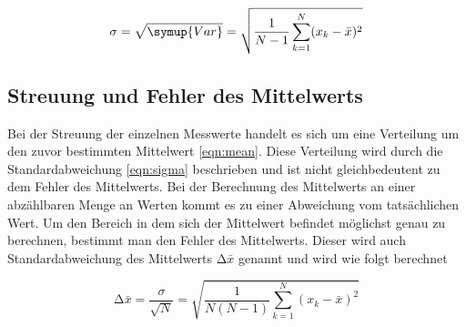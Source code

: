 \begin{equation}
\sigma = \sqrt{\symup{Var}} = \sqrt{\frac{1}{N-1} \sum_{k=1}^N (x_k - \bar{x})^2}
\label{eqn:sigma}
\end{equation}
\subsection{Streuung und Fehler des Mittelwerts}
\begin{flushleft}
Bei der Streuung der einzelnen Messwerte handelt es sich um eine Verteilung um den zuvor bestimmten Mittelwert \eqref{eqn:mean}. 
Diese Verteilung wird durch die Standardabweichung \eqref{eqn:sigma} beschrieben und ist nicht gleichbedeutent zu dem Fehler des Mittelwerts.
Bei der Berechnung des Mittelwerts an einer abzählbaren Menge an Werten kommt es zu einer Abweichung vom tatsächlichen Wert.
Um den Bereich in dem sich der Mittelwert befindet möglichst genau zu berechnen, bestimmt man den Fehler des Mittelwerts. Dieser wird
auch Standardabweichung des Mittelwerts $\increment\bar{x}$ genannt und wird wie folgt berechnet
\end{flushleft}

\begin{equation}
\increment\bar{x} = \frac{\sigma}{\sqrt{N}} = \sqrt{\frac{1}{N(N-1)} \sum_{k=1}^N (x_k - \bar{x})^2}
\label{eqn:seoftm} %
\end{equation}